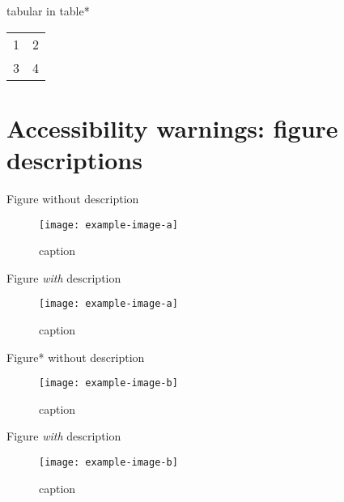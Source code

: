 \documentclass[a-w]{ouab}
\begin{document}
tabular in table*
\begin{table*}[!htb]
 \centering
 \begin{tabular}{cc}
  1 & 2 \\
  3 & 4
 \end{tabular}
\end{table*}

\section*{Accessibility warnings: figure descriptions}

Figure without description
\begin{figure}[!htb]
 \centering
 \texttt{[image: example-image-a]}
 \caption{caption}
\end{figure}

Figure \emph{with} description
\begin{figure}[!htb]
 \centering
 \texttt{[image: example-image-a]}
 \caption{caption}
\end{figure}

Figure* without description
\begin{figure*}[!htb]
 \centering
 \texttt{[image: example-image-b]}
 \caption{caption}
\end{figure*}

Figure \emph{with} description
\begin{figure*}[!htb]
 \centering
 \texttt{[image: example-image-b]}
 \caption{caption}
\end{figure*}
\end{document}
